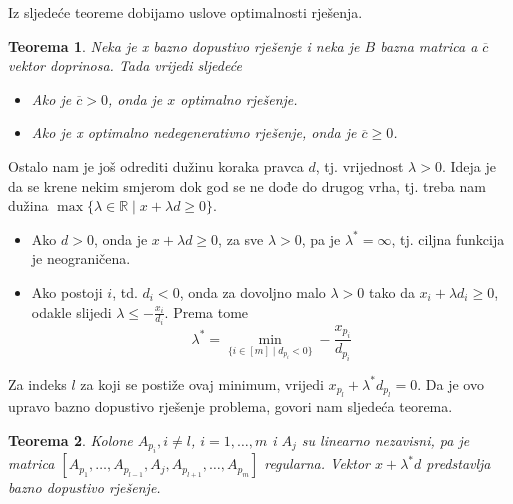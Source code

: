 \documentclass[a4paper, utf8, 11pt, colorlinks]{book}
\newtheorem{thm}{Teorema}
\begin{document}
Iz sljedeće teoreme dobijamo uslove optimalnosti rješenja.

\begin{thm}
  Neka je x bazno dopustivo rješenje i neka je $B$ bazna matrica a $\overline{c}$ vektor doprinosa. Tada vrijedi sljedeće
  \begin{itemize}
      \item Ako je $\overline{c} >0$, onda je $x$ optimalno rješenje.
      \item Ako je x optimalno nedegenerativno rješenje, onda je $\overline{c} \geq 0$.
  \end{itemize}
\end{thm}

Ostalo nam je još odrediti dužinu koraka pravca $d$, tj. vrijednost $\lambda>0$. Ideja je da se krene nekim smjerom dok god se ne dođe do drugog vrha, tj. treba nam dužina $\max \{ \lambda \in \mathbb{R} \mid x + \lambda d \geq 0 \}$. 
\begin{itemize}
    \item Ako $d >0$, onda je $  x + \lambda d \geq 0$, za sve $\lambda > 0$, pa je $\lambda^* = \infty$, tj. ciljna funkcija je neograničena.
    \item Ako postoji $i$, td. $d_i < 0$, onda za dovoljno malo $\lambda>0$ tako da $x_i + \lambda d_i \geq 0$, odakle slijedi $\lambda \leq -\frac{x_i}{d_i}$. Prema tome 
    $$ \lambda^* = \min_{ \{i\in [m] \mid d_{p_i} < 0  \}} - \frac{x_{p_i}}{d_{p_i}} $$
\end{itemize}
Za indeks $l$ za koji se postiže ovaj minimum, vrijedi $x_{p_l} + \lambda^* d_{p_l}=0$.
Da je ovo upravo bazno dopustivo rješenje problema, govori nam sljedeća teorema. 
\begin{thm}
    Kolone $A_{p_i}, i\not = l$, $i=1,\ldots,m$ i $A_{j}$ su linearno nezavisni, pa je matrica 
    $[A_{p_1},\ldots, A_{p_{l-1}}, A_j, A_{p_{l+1}}, \ldots, A_{p_m}]$
    regularna. Vektor $x + \lambda^* d$ predstavlja bazno dopustivo rješenje. 
\end{thm}
\end{document}
